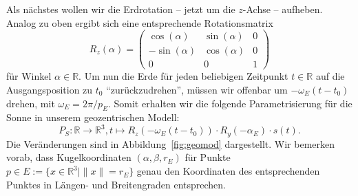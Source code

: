 \documentclass[
    paper=a4,
    DIV14,
    fontsize=12pt,
    pagesize=pdftex,
    toc=bibliographynumbered
]{scrartcl}
\numberwithin{figure}{section}
\numberwithin{equation}{section}
\numberwithin{table}{section}
\newcommand*\setR{\mathds{R}}
\begin{document}
Als nächstes wollen wir die Erdrotation -- jetzt um die $z$-Achse -- aufheben. Analog zu
oben ergibt sich eine entsprechende Rotationsmatrix
\begin{equation*}
    R_z(\alpha) =
    \begin{pmatrix}
         \cos(\alpha) & \sin(\alpha) & 0 \\
        -\sin(\alpha) & \cos(\alpha) & 0 \\
        0             & 0            & 1
    \end{pmatrix}
\end{equation*}
für Winkel $\alpha\in\setR$. Um nun die Erde für jeden beliebigen Zeitpunkt $t\in\setR$
auf die Ausgangsposition zu $t_0$ \enquote{zurückzudrehen}, müssen wir offenbar um
$-\omega_E(t-t_0)$ drehen, mit $\omega_E = 2\pi/p_E$. Somit erhalten wir die folgende
Parametrisierung für die Sonne in unserem geozentrischen Modell:
\begin{equation*}
    P_S : \setR \to \setR^3, t\mapsto R_z(-\omega_E(t-t_0)) \cdot R_y(-\alpha_E) \cdot
    s(t).
\end{equation*}
Die Veränderungen sind in Abbildung~\ref{fig:geomod} dargestellt. Wir bemerken vorab, dass
Kugelkoordinaten $(\alpha, \beta, r_E)$ für Punkte $p \in E := \{ x\in\setR^3 \mid \|x\| =
r_E \}$ genau den Koordinaten des entsprechenden Punktes in Längen- und Breitengraden
entsprechen.
\end{document}
